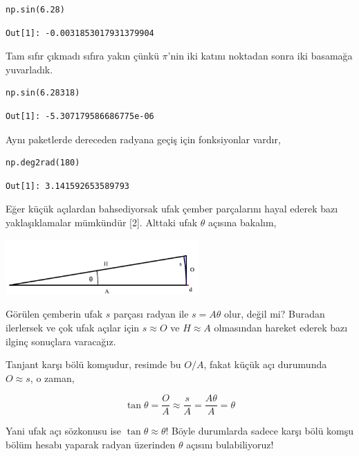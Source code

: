 \documentclass[12pt,fleqn]{article}\usepackage{../../common}
\begin{document}
\begin{verbatim}
np.sin(6.28)
\end{verbatim}

\begin{verbatim}
Out[1]: -0.0031853017931379904
\end{verbatim}

Tam sıfır çıkmadı sıfıra yakın çünkü $\pi$'nin iki katını noktadan sonra iki
basamağa yuvarladık.

\begin{verbatim}
np.sin(6.28318)
\end{verbatim}

\begin{verbatim}
Out[1]: -5.307179586686775e-06
\end{verbatim}

Aynı paketlerde dereceden radyana geçiş için fonksiyonlar vardır,

\begin{verbatim}
np.deg2rad(180)
\end{verbatim}

\begin{verbatim}
Out[1]: 3.141592653589793
\end{verbatim}

Eğer küçük açılardan bahsediyorsak ufak çember parçalarını hayal ederek bazı
yaklaşıklamalar mümkündür [2]. Alttaki ufak $\theta$ açısına bakalım,

\includegraphics[width=20em]{ode_mattuck_50_trig_06.jpg}

Görülen çemberin ufak $s$ parçası radyan ile $s = A \theta$ olur, değil mi?
Buradan ilerlersek ve çok ufak açılar için $s \approx O$ ve $H \approx A$
olmasından hareket ederek bazı ilginç sonuçlara varacağız.

Tanjant karşı bölü komşudur, resimde bu $O / A$, fakat küçük açı durumunda
$O \approx s$, o zaman, 

$$
\tan \theta = \frac{O}{A} \approx \frac{s}{A} = \frac{A\theta}{A} = \theta
$$

Yani ufak açı sözkonusu ise $\tan \theta \approx \theta$! Böyle durumlarda
sadece karşı bölü komşu bölüm hesabı yaparak radyan üzerinden $\theta$
açısını bulabiliyoruz!
\end{document}
